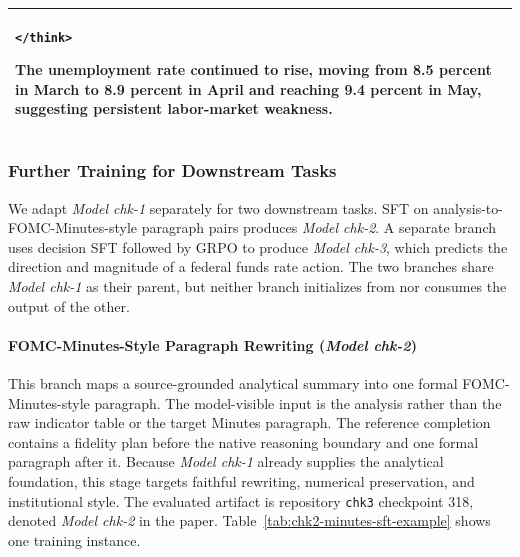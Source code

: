 \begin{table}[!tbp]
\begin{tabularx}{\textwidth}{@{}
    >{\raggedright\arraybackslash}X
@{}}
\par\smallskip
\texttt{</think>}

\par\smallskip
The unemployment rate continued to rise, moving from 8.5 percent in March to
8.9 percent in April and reaching 9.4 percent in May, suggesting persistent
labor-market weakness.
\\

\bottomrule
\end{tabularx}
\end{table}







\subsubsection*{Further Training for Downstream Tasks}

We adapt \textit{Model chk-1} separately for two downstream tasks. SFT on
analysis-to-FOMC-Minutes-style paragraph pairs produces \textit{Model chk-2}.
A separate branch uses decision SFT followed by GRPO to produce
\textit{Model chk-3}, which predicts the direction and magnitude of a federal
funds rate action. The two branches share \textit{Model chk-1} as their parent,
but neither branch initializes from nor consumes the output of the other.


\paragraph*{FOMC-Minutes-Style Paragraph Rewriting (\textit{Model chk-2})}
This branch maps a source-grounded analytical summary into one formal
FOMC-Minutes-style paragraph. The model-visible input is the analysis
rather than the raw indicator table or the target Minutes paragraph. The
reference completion contains a fidelity plan before the native reasoning
boundary and one formal paragraph after it. Because \textit{Model chk-1}
already supplies the analytical foundation, this stage targets faithful
rewriting, numerical preservation, and institutional style. The evaluated
artifact is repository \texttt{chk3} checkpoint 318, denoted \textit{Model
chk-2} in the paper. Table~\ref{tab:chk2-minutes-sft-example}
shows one training instance.



